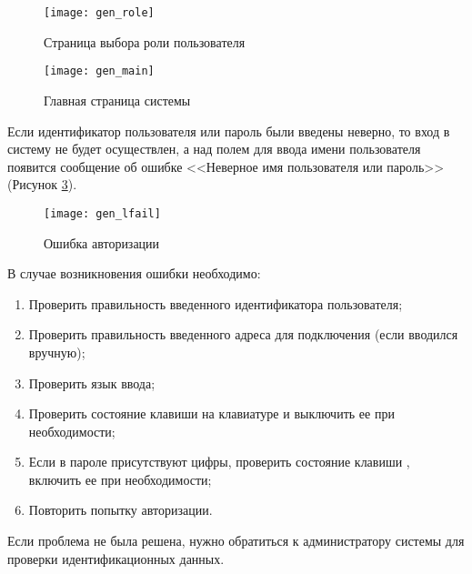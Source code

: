 \begin{figure}[!ht]\centering
 \texttt{[image: gen\_role]}
 \caption{Страница выбора роли пользователя}
 \label{img_gen_role}
\end{figure} 

\begin{figure}[!ht]\centering
 \texttt{[image: gen\_main]}
 \caption{Главная страница системы}
 \label{img_gen_main}
\end{figure} 

Если идентификатор пользователя или пароль были введены неверно, то вход в систему не будет осуществлен, а над полем для ввода имени пользователя появится сообщение об ошибке <<Неверное имя пользователя или пароль>> (Рисунок \ref{img_gen_lfail}).

\begin{figure}[!ht]\centering
 \texttt{[image: gen\_lfail]}
 \caption{Ошибка авторизации}
 \label{img_gen_lfail}
\end{figure} 

В случае возникновения ошибки необходимо:
\begin{enumerate}
 \item Проверить правильность введенного идентификатора пользователя;
 \item Проверить правильность введенного адреса для подключения (если вводился вручную);
 \item Проверить язык ввода;
 \item Проверить состояние клавиши  на клавиатуре и выключить ее при необходимости;
 \item Если в пароле присутствуют цифры, проверить состояние клавиши , включить ее при необходимости;
 \item Повторить попытку авторизации.
\end{enumerate}
 
Если проблема не была решена, нужно обратиться к администратору системы для проверки идентификационных данных.

